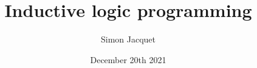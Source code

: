 \documentclass{beamer}
\title[Inductive logic programming]{Inductive logic programming}
\subtitle{}
\author{Simon Jacquet}
\institute[Unamur]{Faculty of Computer Science\\Unamur}
\date{December 20th 2021}
\begin{document}
\frame{\titlepage}



%
\end{document}

